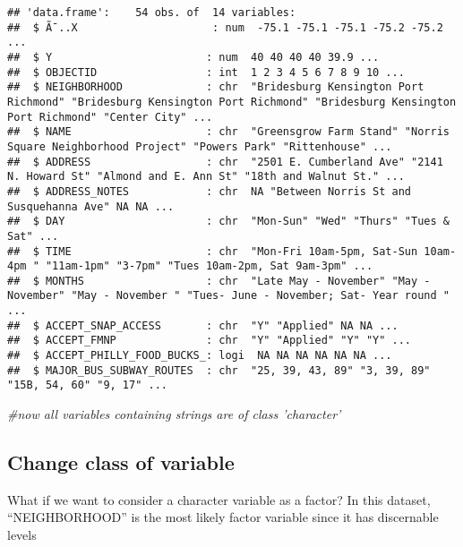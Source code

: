 \documentclass[]{article}
\newenvironment{Shaded}{\begin{snugshade}}{\end{snugshade}}
\newcommand{\KeywordTok}[1]{\textcolor[rgb]{0.13,0.29,0.53}{\textbf{#1}}}
\newcommand{\StringTok}[1]{\textcolor[rgb]{0.31,0.60,0.02}{#1}}
\newcommand{\CommentTok}[1]{\textcolor[rgb]{0.56,0.35,0.01}{\textit{#1}}}
\newcommand{\OperatorTok}[1]{\textcolor[rgb]{0.81,0.36,0.00}{\textbf{#1}}}
\newcommand{\NormalTok}[1]{#1}
\begin{document}
\begin{verbatim}
## 'data.frame':    54 obs. of  14 variables:
##  $ Ã¯..X                     : num  -75.1 -75.1 -75.1 -75.2 -75.2 ...
##  $ Y                        : num  40 40 40 40 39.9 ...
##  $ OBJECTID                 : int  1 2 3 4 5 6 7 8 9 10 ...
##  $ NEIGHBORHOOD             : chr  "Bridesburg Kensington Port Richmond" "Bridesburg Kensington Port Richmond" "Bridesburg Kensington Port Richmond" "Center City" ...
##  $ NAME                     : chr  "Greensgrow Farm Stand" "Norris Square Neighborhood Project" "Powers Park" "Rittenhouse" ...
##  $ ADDRESS                  : chr  "2501 E. Cumberland Ave" "2141 N. Howard St" "Almond and E. Ann St" "18th and Walnut St." ...
##  $ ADDRESS_NOTES            : chr  NA "Between Norris St and Susquehanna Ave" NA NA ...
##  $ DAY                      : chr  "Mon-Sun" "Wed" "Thurs" "Tues & Sat" ...
##  $ TIME                     : chr  "Mon-Fri 10am-5pm, Sat-Sun 10am-4pm " "11am-1pm" "3-7pm" "Tues 10am-2pm, Sat 9am-3pm" ...
##  $ MONTHS                   : chr  "Late May - November" "May - November" "May - November " "Tues- June - November; Sat- Year round " ...
##  $ ACCEPT_SNAP_ACCESS       : chr  "Y" "Applied" NA NA ...
##  $ ACCEPT_FMNP              : chr  "Y" "Applied" "Y" "Y" ...
##  $ ACCEPT_PHILLY_FOOD_BUCKS_: logi  NA NA NA NA NA NA ...
##  $ MAJOR_BUS_SUBWAY_ROUTES  : chr  "25, 39, 43, 89" "3, 39, 89" "15B, 54, 60" "9, 17" ...
\end{verbatim}

\begin{Shaded}
\begin{Highlighting}[]
\CommentTok{#now all variables containing strings are of class 'character'}
\end{Highlighting}
\end{Shaded}

\subsection{Change class of variable}\label{change-class-of-variable}

What if we want to consider a character variable as a factor? In this
dataset, ``NEIGHBORHOOD'' is the most likely factor variable since it
has discernable levels

\begin{Shaded}
\end{Shaded}
\end{document}
